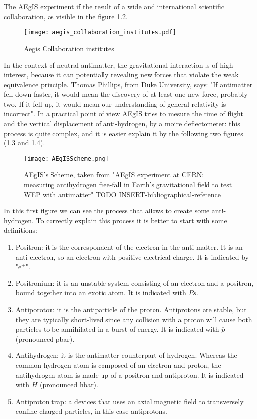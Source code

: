 The AEgIS experiment if the result of a wide and international scientific collaboration, as visible in the figure 1.2.

\begin{figure}[H]
\centering 
\texttt{[image: aegis\_collaboration\_institutes.pdf]} 
\caption{Aegis Collaboration institutes}
\end{figure}


In the context of neutral antimatter, the gravitational interaction is of high interest, because it can potentially revealing new forces that violate the weak equivalence principle. Thomas Phillips, from Duke University, says: "If antimatter fell down faster, it would mean the discovery of at least one new force, probably two. If it fell up, it would mean our understanding of general relativity is incorrect". In a practical point of view AEgIS tries to mesure the time of flight and the vertical displacement of anti-hydrogen, by a moire deflectometer: this process is quite complex, and it is easier explain it by the following two figures (1.3 and 1.4).

\begin{figure}[H]
\centering 
\texttt{[image: AEgISScheme.png]} 
\caption{AEgIS's Scheme, taken from "AEgIS experiment at CERN: measuring antihydrogen free-fall in Earth’s gravitational field to test WEP with antimatter" TODO INSERT-bibliographical-reference}
\end{figure}

In this first figure we can see the process that allows to create some anti-hydrogen. To correctly explain this process it is better to start with some definitions:


\begin{enumerate}

\item Positron: it is the correspondent of the electron in the anti-matter. It is an anti-electron, so an electron with positive electrical charge. It is indicated by "e$^{+}$".

\item Positronium: it is an unstable system consisting of an electron and a positron, bound together into an exotic atom. It is indicated with $ {Ps} $.

\item Antiporoton: it is the antiparticle of the proton. Antiprotons are stable, but they are typically short-lived since any collision with a proton will cause both particles to be annihilated in a burst of energy. It is indicated with $ \overline{p} $ (pronounced pbar).

\item Antihydrogen: it is the antimatter counterpart of hydrogen. Whereas the common hydrogen atom is composed of an electron and proton, the antihydrogen atom is made up of a positron and antiproton. It is indicated with $ \overline{H} $ (pronounced hbar).


\item Antiproton trap: a devices that uses an axial magnetic field to transversely confine charged particles, in this case antiprotons.


\end{enumerate}

